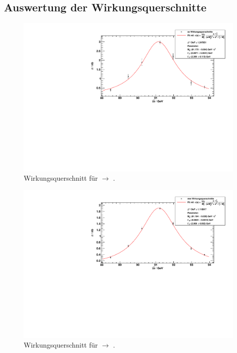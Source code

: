 \subsection{Auswertung der Wirkungsquerschnitte}
\begin{figure}[H]
\begin{center}
  \includegraphics[width=\textwidth]{../img/crosssections_ee.pdf}
  \caption{Wirkungsquerschnitt für \ee $\to$ \ee.}
  \label{img:crosssection:ee}
\end{center}
\end{figure}

\begin{figure}[H]
\begin{center}
  \includegraphics[width=\textwidth]{../img/crosssections_mm.pdf}
  \caption{Wirkungsquerschnitt für \ee $\to$ \mm.}
  \label{img:crosssection:mm}
\end{center}
\end{figure}

